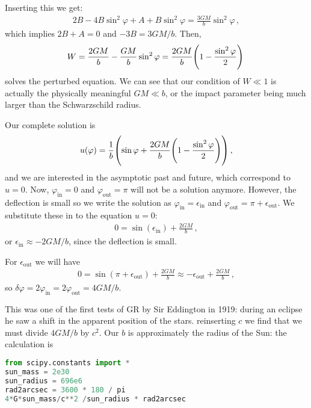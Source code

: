 \documentclass[main.tex]{subfiles}
\begin{document}
Inserting this we get:
%
\begin{align}
  2B - 4B \sin^2\varphi + A + B \sin^2\varphi 
  = \frac{3GM}{b} \sin^2\varphi 
\,,
\end{align}
%
which implies \(2B+A = 0\) and \(-3B = 3GM/b\). Then, 
%
\begin{align}
  W = \frac{2GM}{b} - \frac{GM}{b} \sin^2\varphi 
  = \frac{2GM}{b} \qty(1 - \frac{\sin^2\varphi}{2} )
\,
\end{align}
%
solves the perturbed equation. 
We can see that our condition of \(W \ll 1\) is actually the physically meaningful \(GM \ll b\), or the impact parameter being much larger than the Schwarzschild radius. 

Our complete solution is 
%
\begin{align}
  u (\varphi ) = \frac{1}{b} \qty(\sin \varphi + \frac{2GM}{b} \qty(1 - \frac{\sin^2\varphi}{2}))
\,,
\end{align}
%
and we are interested in the asymptotic past and future, which correspond to \(u =0\). 
Now, \(\varphi _{\text{in}}= 0\) and \(\varphi _{\text{out}} = \pi\) will not be a solution anymore. However, the deflection is small so we write the solution as \(\varphi _{\text{in}} = \epsilon _{\text{in}}\) and \(\varphi _{\text{out}} = \pi + \epsilon _{\text{out}}\).
We substitute these in to the equation \(u = 0\): 
%
\begin{align}
  0 = \sin(\epsilon _{\text{in}}) + \frac{2GM}{b}
\,,
\end{align}
%
or \(\epsilon _{\text{in}} \approx - 2GM/b\), since the deflection is small. 

For \(\epsilon _{\text{out}}\) we will have 
%
\begin{align}
  0= \sin(\pi + \epsilon _{\text{out}}) + \frac{2GM}{b} \approx - \epsilon _{\text{out}} + \frac{2GM}{b}
\,,
\end{align}
%
so \(\delta \varphi = 2 \varphi _{\text{in}} = 2 \varphi _{\text{out}} = 4GM/b\). 

This was one of the first tests of GR by Sir Eddington in 1919: during an eclipse he saw a shift in the apparent position of the stars. reinserting \(c\) we find that we must divide \(4GM/b\) by \(c^2\). 
Our \(b\) is approximately the radius of the Sun: the calculation is
\begin{lstlisting}[language=Python]
from scipy.constants import *
sun_mass = 2e30
sun_radius = 696e6
rad2arcsec = 3600 * 180 / pi
4*G*sun_mass/c**2 /sun_radius * rad2arcsec
\end{lstlisting}
\end{document}
